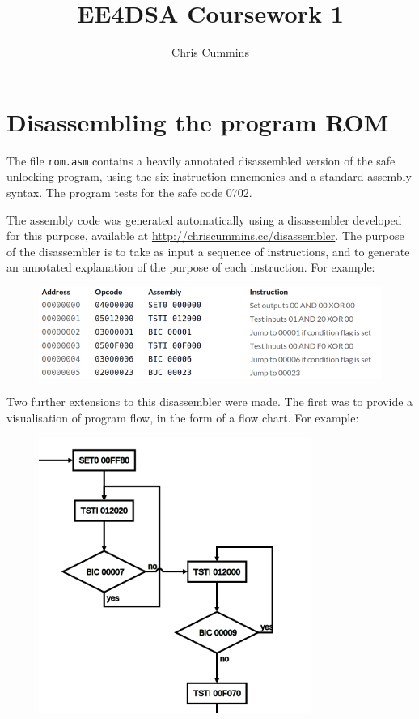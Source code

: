\documentclass[12pt,a4paper]{article}
\title{EE4DSA Coursework 1}
\author{Chris Cummins}
\begin{document}
\maketitle

\section{Disassembling the program ROM}

The file \texttt{rom.asm} contains a heavily annotated disassembled
version of the safe unlocking program, using the six instruction
mnemonics and a standard assembly syntax. The program tests for the
safe code 0702.

The assembly code was generated automatically using a disassembler
developed for this purpose, available at
\url{http://chriscummins.cc/disassembler}. The purpose of the
disassembler is to take as input a sequence of instructions, and to
generate an annotated explanation of the purpose of each
instruction. For example:

\begin{figure}[H]
  \centering
  \includegraphics[width=5in]{assets/disassembled.png}
\end{figure}

Two further extensions to this disassembler were made. The first was
to provide a visualisation of program flow, in the form of a flow
chart. For example:

\begin{figure}[H]
  \centering
  \includegraphics[width=3.5in]{assets/chart.png}
\end{figure}
\end{document}
